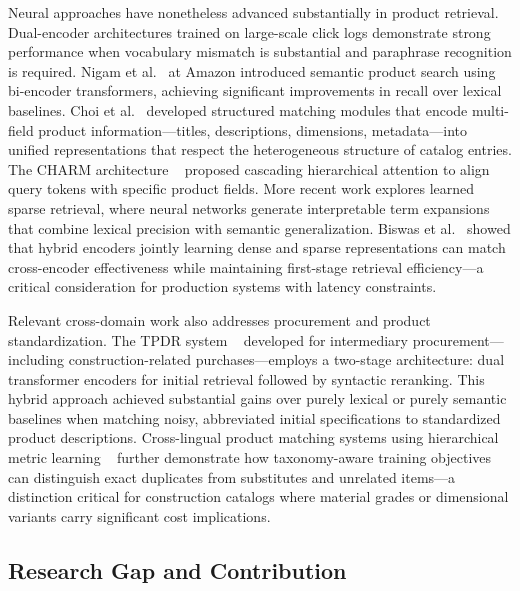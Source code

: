 \documentclass[preprint,review,12pt]{elsarticle}
\begin{document}
Neural approaches have nonetheless advanced substantially in product retrieval. Dual-encoder architectures trained on large-scale click logs demonstrate strong performance when vocabulary mismatch is substantial and paraphrase recognition is required. Nigam et al.~\cite{nigamSemanticProductSearch2019a} at Amazon introduced semantic product search using bi-encoder transformers, achieving significant improvements in recall over lexical baselines. Choi et al.~\cite{choiSemanticProductSearch2020} developed structured matching modules that encode multi-field product information—titles, descriptions, dimensions, metadata—into unified representations that respect the heterogeneous structure of catalog entries. The CHARM architecture ~\cite{freymuthHierarchicalMultifieldRepresentations2025} proposed cascading hierarchical attention to align query tokens with specific product fields. More recent work explores learned sparse retrieval, where neural networks generate interpretable term expansions that combine lexical precision with semantic generalization. Biswas et al.~\cite{biswasEfficientInterpretableInformation2024} showed that hybrid encoders jointly learning dense and sparse representations can match cross-encoder effectiveness while maintaining first-stage retrieval efficiency—a critical consideration for production systems with latency constraints.

Relevant cross-domain work also addresses procurement and product standardization. The TPDR system ~\cite{cunhaTPDRNovelTwoStep2023} developed for intermediary procurement—including construction-related purchases—employs a two-stage architecture: dual transformer encoders for initial retrieval followed by syntactic reranking. This hybrid approach achieved substantial gains over purely lexical or purely semantic baselines when matching noisy, abbreviated initial specifications to standardized product descriptions. Cross-lingual product matching systems using hierarchical metric learning ~\cite{kooDeepMetricLearning2023} further demonstrate how taxonomy-aware training objectives can distinguish exact duplicates from substitutes and unrelated items—a distinction critical for construction catalogs where material grades or dimensional variants carry significant cost implications.

\subsection{Research Gap and Contribution}
\end{document}
